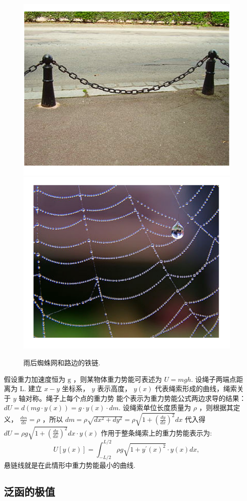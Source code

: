 \begin{itemize}
\begin{figure}
    \includegraphics[width=0.45\linewidth]{roadside.png}
    \includegraphics[width=0.45\linewidth]{cobweb.png}
    \caption{雨后蜘蛛网和路边的铁链.}
    \label{fig:catenary_example}
  \end{figure}

  假设重力加速度恒为 $\mathrm{g}$ ，则某物体重力势能可表述为 $U=m g h$. 设绳子两端点距离为 $\mathrm{L}$.
建立 $x-y$ 坐标系， $y$ 表示高度， $y(x)$ 代表绳索形成的曲线，绳索关于 $y$ 轴对称。绳子上每个点的重力势 能个表示为重力势能公式两边求导的结果： $d U=d(m g \cdot y(x))=g \cdot y(x) \cdot d m$.
设绳索单位长度质量为 $\rho$ ，则根据其定义， $\frac{d m}{d s}=\rho$ ，所以
$d m=\rho \sqrt{d x^2+d y^2}=\rho \sqrt{1+\left(\frac{d y}{d x}\right)^2} d x$
代入得 $d U=\rho g \sqrt{1+\left(\frac{d y}{d x}\right)^2} d x \cdot y(x)$
作用于整条绳索上的重力势能表示为:
$$
U[y(x)]=\int_{-L / 2}^{L / 2} \rho g \sqrt{1+y^{\prime}(x)^2} \cdot y(x) d x,
$$
悬链线就是在此情形中重力势能最小的曲线. 


\end{itemize}

\subsection{泛函的极值}


